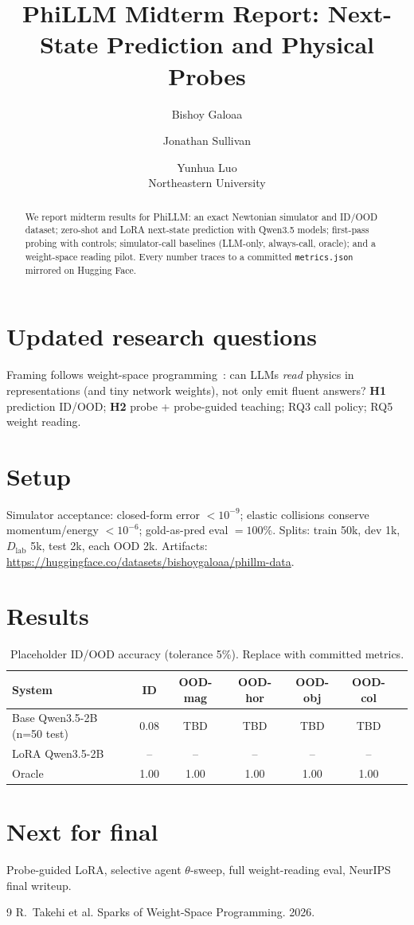 \documentclass{article}
\title{PhiLLM Midterm Report: Next-State Prediction and Physical Probes}
\author{
  Bishoy Galoaa \and Jonathan Sullivan \and Yunhua Luo \\
  Northeastern University
}
\begin{document}
\maketitle

\begin{abstract}
We report midterm results for PhiLLM: an exact Newtonian simulator and ID/OOD dataset;
zero-shot and LoRA next-state prediction with Qwen3.5 models; first-pass probing with controls;
simulator-call baselines (LLM-only, always-call, oracle); and a weight-space reading pilot.
Every number traces to a committed \texttt{metrics.json} mirrored on Hugging Face.
\end{abstract}

\section{Updated research questions}
Framing follows weight-space programming~\cite{takehi2026}: can LLMs \emph{read} physics in representations (and tiny network weights), not only emit fluent answers?
\textbf{H1} prediction ID/OOD; \textbf{H2} probe + probe-guided teaching; RQ3 call policy; RQ5 weight reading.

\section{Setup}
Simulator acceptance: closed-form error $<10^{-9}$; elastic collisions conserve momentum/energy $<10^{-6}$; gold-as-pred eval $=100\%$.
Splits: train 50k, dev 1k, $D_{\mathrm{lab}}$ 5k, test 2k, each OOD 2k. Artifacts: \url{https://huggingface.co/datasets/bishoygaloaa/phillm-data}.

\section{Results}
\begin{table}[h]
\centering
\caption{Placeholder ID/OOD accuracy (tolerance 5\%). Replace with committed metrics.}
\begin{tabular}{lcccccc}
\toprule
System & ID & OOD-mag & OOD-hor & OOD-obj & OOD-col \\
\midrule
Base Qwen3.5-2B (n=50 test) & 0.08 & TBD & TBD & TBD & TBD \\
LoRA Qwen3.5-2B & -- & -- & -- & -- & -- \\
Oracle & 1.00 & 1.00 & 1.00 & 1.00 & 1.00 \\
\bottomrule
\end{tabular}
\end{table}

\section{Next for final}
Probe-guided LoRA, selective agent $\theta$-sweep, full weight-reading eval, NeurIPS final writeup.

\begin{thebibliography}{9}
 R.~Takehi et al. Sparks of Weight-Space Programming. 2026.
\end{thebibliography}
\end{document}
